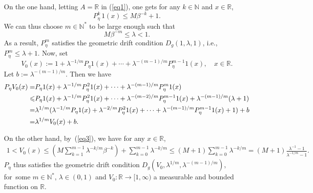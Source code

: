 \documentclass[11pt]{elsarticle}
\def\leq{\leqslant}
\def\N{\mathbb{N}}
\def\R{\mathbb{R}}
\begin{document}
\begin{pf}
	On the one hand, letting $A=\R$ in (\ref{eq1}), one gets for any $k\in\N$ and $x\in \R$,
	\begin{equation}\label{eq3}
		P_\eta^k\,1(x)\leq M\beta^{-k}+1.
	\end{equation}
	We can thus choose $m\in\N^*$ to be large enough such that
	\begin{equation*}
		M\beta^{-m}\leq\lambda<1.
	\end{equation*}
	As a result, $P^{m}_\eta$ satisfies the geometric drift condition $D_g(1,\lambda,1)$, i.e.,~ $P^{m}_\eta\leq\lambda+1$. Now, set 
	$$V_0(x):=1+\lambda^{-1/m}P_\eta1(x)+\cdots+\lambda^{-(m-1)/m}P_{\eta}^{m-1}1(x),\quad x\in \R.$$
	Let $b:=\lambda^{-(m-1)/m}$. Then we have	
		\begin{align}
			P_\eta V_0(x)=&P_\eta1(x)+\lambda^{-1/m}P_\eta^21(x)+\cdots+\lambda^{-(m-1)/m}P_\eta^m1(x)\notag\\
			\leq& P_{\eta}1(x)+\lambda^{-1/m}P_\eta^21(x)+\cdots+\lambda^{-(m-2)/m}P_{\eta}^{m-1}1(x)+\lambda^{-(m-1)/m}(\lambda+1) \label{eq2}\\
			=&\lambda^{1/m}(\lambda^{-1/m}P_\eta1(x)+\lambda^{-2/m}P_\eta^21(x)+\cdots+\lambda^{-(m-1)/m}P_\eta^{m-1}1(x)+1)+b\notag\\
			=&\lambda^{1/m}V_0(x)+b.\notag
		\end{align}
	
	On the other hand, by~(\ref{eq3}), we have for any $x\in \R$,\vspace{-12pt}
      \begin{align*}
			1< V_0(x)\leq\left(M\sum_{k=1}^{m-1}\lambda^{-k/m}\beta^{-k}\right)+\sum_{k=0}^{m-1}\lambda^{-k/m}\leq(M+1)\sum_{k=0}^{m-1}\lambda^{-k/m}=(M+1)\frac{\lambda^{-1}-1}{\lambda^{-1/m}-1}.
		\end{align*}
	$P_\eta$ thus satisfies the geometric drift condition $D_g(V_0,\lambda^{1/m},\lambda^{-(m-1)/m})$, for~some $m\in\N^*$, $\lambda\in(0,1)$ and $V_0:\R\rightarrow[1,\infty)$ a measurable and bounded function on $\R$.
	

\end{pf}
\end{document}
